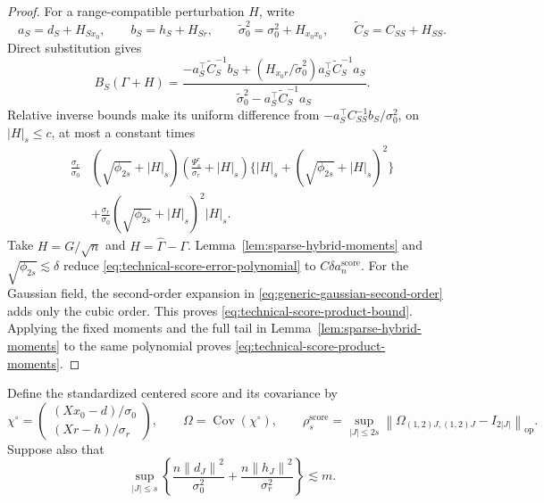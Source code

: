 \documentclass[a4paper,11pt,english]{article}
\newcommand{\Cov}{\operatorname{Cov}}
\newcommand{\norm}[1]{\left\lVert #1\right\rVert}
\begin{document}
\begin{proof}
For a range-compatible perturbation $H$, write
\[
 a_S=d_S+H_{Sx_0},\qquad b_S=h_S+H_{Sr},\qquad
 \widetilde\sigma_0^2=\sigma_0^2+H_{x_0x_0},\qquad
 \widetilde C_S=C_{SS}+H_{SS}.
\]
Direct substitution gives
\begin{equation}\label{eq:technical-exact-product-identity}
 B_S(\Gamma+H)
 =\frac{-a_S^\top\widetilde C_S^{-1}b_S
 +(H_{x_0r}/\widetilde\sigma_0^2)
 a_S^\top\widetilde C_S^{-1}a_S}
 {\widetilde\sigma_0^2-a_S^\top\widetilde C_S^{-1}a_S}.
\end{equation}
Relative inverse bounds make its uniform difference from
$-a_S^\top C_{SS}^{-1}b_S/\sigma_0^2$, on $|H|_s\le c$, at most a
constant times
\begin{equation}\label{eq:technical-score-error-polynomial}
\begin{split}
 \frac{\sigma_r}{\sigma_0}
 &(\sqrt{\phi_{2s}}+|H|_s)
 \left(\frac{\Psi_s^r}{\sigma_r}+|H|_s\right)
 \{ |H|_s+(\sqrt{\phi_{2s}}+|H|_s)^2\}\\
 &+\frac{\sigma_r}{\sigma_0}
 (\sqrt{\phi_{2s}}+|H|_s)^2|H|_s.
\end{split}
\end{equation}
Take $H=G/\sqrt n$ and $H=\hat\Gamma-\Gamma$.
Lemma~\ref{lem:sparse-hybrid-moments} and
$\sqrt{\phi_{2s}}\lesssim\delta$ reduce
\eqref{eq:technical-score-error-polynomial} to
$C\delta a_n^{\mathrm{score}}$.  For the Gaussian field, the
second-order expansion in
\eqref{eq:generic-gaussian-second-order} adds only the cubic order.
This proves \eqref{eq:technical-score-product-bound}.  Applying the
fixed moments and the full tail in
Lemma~\ref{lem:sparse-hybrid-moments} to the same polynomial proves
\eqref{eq:technical-score-product-moments}.
\end{proof}

Define the standardized centered score and its covariance by
\begin{equation}\label{eq:technical-score-covariance}
 \chi^\circ=
 \begin{pmatrix}(Xx_0-d)/\sigma_0\\(Xr-h)/\sigma_r\end{pmatrix},
 \qquad \Omega=\Cov(\chi^\circ),
 \qquad
 \rho_s^{\mathrm{score}}
 =\sup_{|J|\le2s}
 \norm{\Omega_{(1,2)J,(1,2)J}-I_{2|J|}}_{\mathrm{op}}.
\end{equation}
Suppose also that
\begin{equation}\label{eq:technical-score-mean-cap}
 \sup_{|J|\le s}\left\{
 \frac{n\norm{d_J}^2}{\sigma_0^2}
 +\frac{n\norm{h_J}^2}{\sigma_r^2}
 \right\}\lesssim m.
\end{equation}
\end{document}
